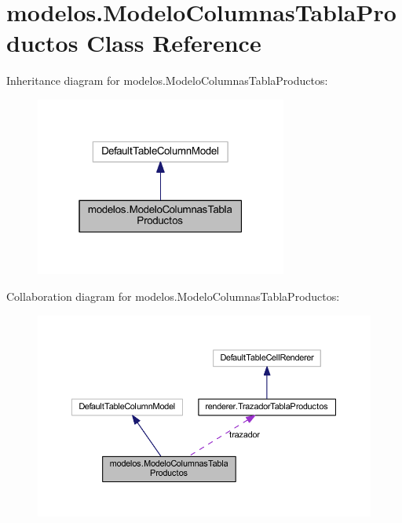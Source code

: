 \hypertarget{classmodelos_1_1_modelo_columnas_tabla_productos}{}\section{modelos.\+Modelo\+Columnas\+Tabla\+Productos Class Reference}
\label{classmodelos_1_1_modelo_columnas_tabla_productos}


Inheritance diagram for modelos.\+Modelo\+Columnas\+Tabla\+Productos\+:\nopagebreak
\begin{figure}[H]
\begin{center}
\leavevmode
\includegraphics[width=235pt]{classmodelos_1_1_modelo_columnas_tabla_productos__inherit__graph}
\end{center}
\end{figure}


Collaboration diagram for modelos.\+Modelo\+Columnas\+Tabla\+Productos\+:\nopagebreak
\begin{figure}[H]
\begin{center}
\leavevmode
\includegraphics[width=350pt]{classmodelos_1_1_modelo_columnas_tabla_productos__coll__graph}
\end{center}
\end{figure}
